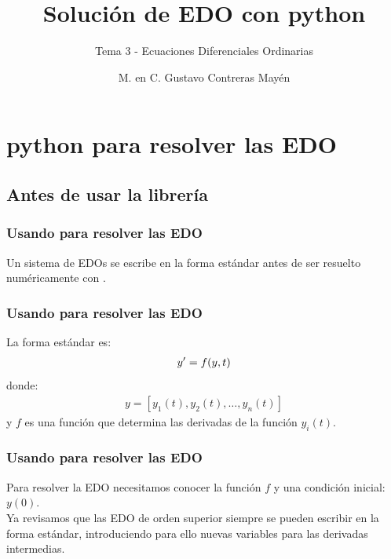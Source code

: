 \documentclass[12pt]{beamer}
\title{\large{Solución de EDO con python}}
\subtitle{Tema 3 - Ecuaciones Diferenciales Ordinarias}
\author{M. en C. Gustavo Contreras Mayén}
\date{}
\begin{document}
\maketitle

\section{python para resolver las EDO}
\subsection{Antes de usar la librería}

\begin{frame}
\frametitle{Usando \python{} para resolver las EDO}
Un sistema de EDOs se escribe en la forma estándar antes de ser resuelto numéricamente con \python.
\end{frame}
\begin{frame}
\frametitle{Usando \python{} para resolver las EDO}
La forma estándar es:
\begin{align*}
{y}^{\prime} = f (y, t)
\end{align*}
\pause
donde:
\pause
\begin{align*}
y = [y_{1} (t), y_{2} (t), \ldots, y _{n} (t)]
\end{align*}
y $f$ es una función que determina las derivadas de la función $y_{i} (t)$.
\end{frame}
\begin{frame}
\frametitle{Usando \python{} para resolver las EDO}
Para resolver la EDO necesitamos conocer la función $f$ y una condición inicial: $y (0)$.
\\
\medskip
\pause
Ya revisamos que las EDO de orden superior siempre se pueden escribir en la forma estándar, introduciendo para ello nuevas variables para las derivadas intermedias.
\end{frame}
\end{document}
